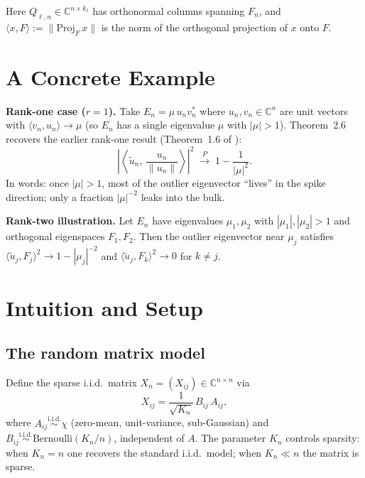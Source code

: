 \documentclass[11pt,a4paper]{article}
\begin{document}
Here $Q_{\ell,n} \in \mathbb{C}^{n \times k_\ell}$ has orthonormal columns spanning $F_n$, and $\langle x, F \rangle := \|\mathrm{Proj}_F\, x\|$ is the norm of the orthogonal projection of $x$ onto $F$.

\section{A Concrete Example}

\textbf{Rank-one case ($r=1$).}  Take $E_n = \mu\, u_n v_n^*$ where $u_n, v_n \in \mathbb{C}^n$ are unit vectors with $\langle v_n, u_n\rangle \to \mu$ (so $E_n$ has a single eigenvalue $\mu$ with $|\mu|>1$).  Theorem~2.6 recovers the earlier rank-one result (Theorem~1.6 of \cite{HLN26}):
\[
\left|\left\langle \tilde{u}_n,\, \frac{u_n}{\|u_n\|}\right\rangle\right|^2 \;\xrightarrow{\;P\;}\; 1 - \frac{1}{|\mu|^2}.
\]
In words: once $|\mu|>1$, most of the outlier eigenvector ``lives'' in the spike direction; only a fraction $|\mu|^{-2}$ leaks into the bulk.

\textbf{Rank-two illustration.}  Let $E_n$ have eigenvalues $\mu_1, \mu_2$ with $|\mu_1|, |\mu_2| > 1$ and orthogonal eigenspaces $F_1, F_2$.  Then the outlier eigenvector near $\mu_j$ satisfies $\langle \tilde{u}_j, F_j \rangle^2 \to 1-|\mu_j|^{-2}$ and $\langle \tilde{u}_j, F_k \rangle^2 \to 0$ for $k\neq j$.

\section{Intuition and Setup}

\subsection{The random matrix model}
Define the sparse i.i.d.\ matrix $X_n = (X_{ij}) \in \mathbb{C}^{n\times n}$ via
\[
X_{ij} = \frac{1}{\sqrt{K_n}}\, B_{ij}\, A_{ij},
\]
where $A_{ij} \overset{\text{i.i.d.}}{\sim} \chi$ (zero-mean, unit-variance, sub-Gaussian) and $B_{ij} \overset{\text{i.i.d.}}{\sim} \mathrm{Bernoulli}(K_n/n)$, independent of $A$.  The parameter $K_n$ controls sparsity: when $K_n = n$ one recovers the standard i.i.d.\ model; when $K_n \ll n$ the matrix is sparse.
\end{document}
